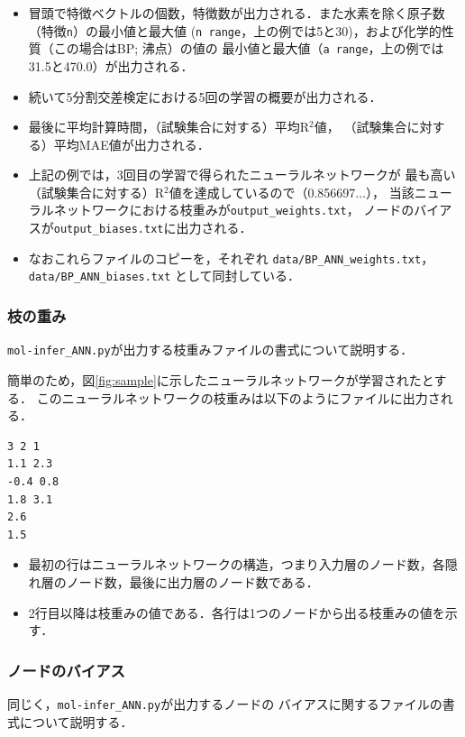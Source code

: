 \documentclass[11pt, titlepage, dvipdfmx, twoside]{jarticle}
\newcommand{\figref}[1]{図\ref{fig:#1}}
\begin{document}
\begin{itemize}
\item  冒頭で特徴ベクトルの個数，特徴数が出力される．また水素を除く原子数（特徴\verb|n|）の最小値と最大値 (\verb|n range|，上の例では5と30)，および化学的性質（この場合はBP; 沸点）の値の
最小値と最大値（\verb|a range|，上の例では31.5と470.0）が出力される．
\item 続いて5分割交差検定における5回の学習の概要が出力される．
\item 最後に平均計算時間，（試験集合に対する）平均R$^2$値，
（試験集合に対する）平均MAE値が出力される．
\item 上記の例では，3回目の学習で得られたニューラルネットワークが
最も高い（試験集合に対する）R$^2$値を達成しているので（0.856697$\dots$），
当該ニューラルネットワークにおける枝重みが\verb|output_weights.txt|，
ノードのバイアスが\verb|output_biases.txt|に出力される．
\item なおこれらファイルのコピーを，それぞれ
\verb|data/BP_ANN_weights.txt|，\verb|data/BP_ANN_biases.txt|
として同封している．
\end{itemize}


\subsubsection{枝の重み}
\verb|mol-infer_ANN.py|が出力する枝重みファイルの書式について説明する．

簡単のため，\figref{sample}に示したニューラルネットワークが学習されたとする．
このニューラルネットワークの枝重みは以下のようにファイルに出力される．

\begin{oframed}
{\small
\begin{verbatim}
3 2 1
1.1 2.3
-0.4 0.8
1.8 3.1
2.6
1.5
\end{verbatim}
}
\end{oframed}
\begin{itemize}
\item 最初の行はニューラルネットワークの構造，つまり入力層のノード数，各隠れ層のノード数，最後に出力層のノード数である．
\item 2行目以降は枝重みの値である．各行は1つのノードから出る枝重みの値を示す．
\end{itemize}


\subsubsection{ノードのバイアス}
同じく，\verb|mol-infer_ANN.py|が出力するノードの
バイアスに関するファイルの書式について説明する．
\end{document}
